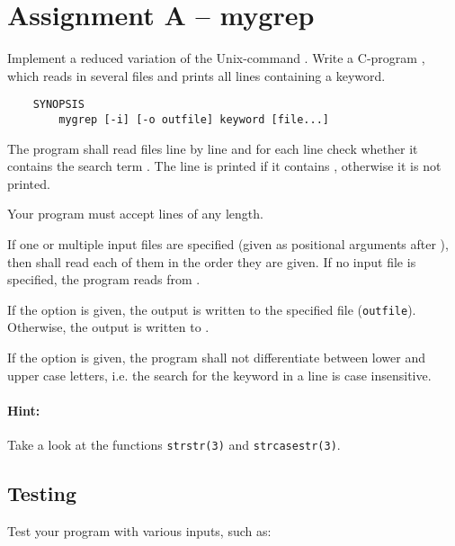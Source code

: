 




\section*{Assignment A -- mygrep}

Implement a reduced variation of the Unix-command .
Write a C-program ,
which reads in several files and prints all lines containing a keyword.

\begin{verbatim}
    SYNOPSIS
        mygrep [-i] [-o outfile] keyword [file...]
\end{verbatim}

The program  shall read files line by line
and for each line check whether it contains the search term .
The line is printed if it contains ,
otherwise it is not printed.

Your program must accept lines of any length.

If one or multiple input files are specified
(given as positional arguments after ),
then  shall read each of them in the order they are given.
If no input file is specified, the program reads from .

If the option  is given,
the output is written to the specified file (\verb|outfile|).
Otherwise, the output is written to .

If the option  is given,
the program shall not differentiate between lower and upper case letters,
i.e. the search for the keyword in a line is case insensitive.

\paragraph*{Hint:}
Take a look at the functions \verb|strstr(3)| and \verb|strcasestr(3)|.

\subsection*{Testing}

Test your program with various inputs, such as:


\osueguidelinesone



